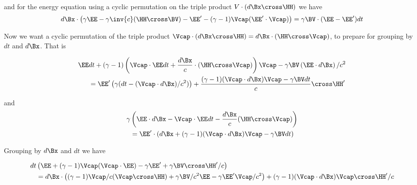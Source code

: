 and for the energy equation using a cyclic permutation on the triple product $V \cdot (d\Bx \cross \HH)$ we have
\begin{equation}\label{eqn:lorentz_force_tx_2:140}
\begin{aligned}
d\Bx \cdot \left( \gamma \EE 
- \gamma \inv{c} (\HH \cross \BV)
-\EE' - (\gamma-1) \Vcap (\EE' \cdot \Vcap)
\right)
= \gamma \BV \cdot (\EE -\EE')dt 
\end{aligned}
\end{equation}

Now we want a cyclic permutation of the triple product $\Vcap \cdot (d\Bx \cross \HH) = d\Bx \cdot (\HH \cross \Vcap)$, to prepare for grouping by $dt$ and $d\Bx$.  That is

\begin{equation}\label{eqn:lorentz_force_tx_2:160}
\begin{aligned}
\EE &dt 
+ (\gamma-1)\left(
\Vcap \cdot \EE dt 
+\frac{d\Bx}{c} \cdot (\HH \cross \Vcap)
\right) \Vcap - \gamma \BV \left( \EE \cdot d\Bx \right)/c^2  \\
&=
\EE' \left(\gamma ( dt - (\Vcap \cdot d\Bx )/c^2 )\right) + \frac{(\gamma-1)(\Vcap \cdot d\Bx) \Vcap - \gamma \BV dt}{c} \cross \HH' 
\end{aligned}
\end{equation}

and
\begin{equation}\label{eqn:lorentz_force_tx_2:180}
\begin{aligned}
\gamma &\left( \EE \cdot d\Bx - 
\Vcap \cdot \EE dt 
-\frac{d\Bx}{c} (\HH \cross \Vcap)
\right) \\
&=
\EE' \cdot \left(d\Bx + (\gamma-1)(\Vcap \cdot d\Bx) \Vcap - \gamma \BV dt\right)
\end{aligned}
\end{equation}

Grouping by $d\Bx$ and $dt$ we have

\begin{equation}\label{eqn:lorentz_force_tx_2:200}
\begin{aligned}
dt &\left(
\EE 
+ (\gamma-1) \Vcap (\Vcap \cdot \EE)
- \gamma \EE' 
+ \gamma \BV \cross \HH'/c 
\right)
\\
&=
d\Bx \cdot \left(
(\gamma-1) \Vcap/c (\Vcap \cross \HH)
+ \gamma \BV/c^2 \EE 
- \gamma \EE' \Vcap/c^2 
\right)
+ (\gamma-1)(\Vcap \cdot d\Bx) \Vcap \cross \HH'/c
\end{aligned}
\end{equation}


